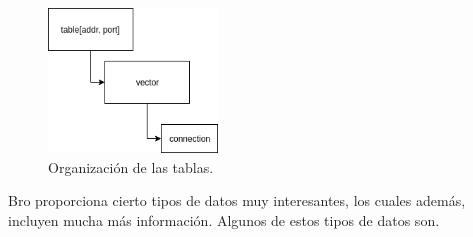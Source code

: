 \begin{figure}[H]
  \includegraphics[width=0.4\textwidth]{imagenes/tablas.png}
  \centering
  \caption{Organización de las tablas.}\label{fig.tablas}
\end{figure}

\intro Bro proporciona cierto tipos de datos muy interesantes, los cuales además, incluyen mucha más información. Algunos de estos 
tipos de datos son. 

